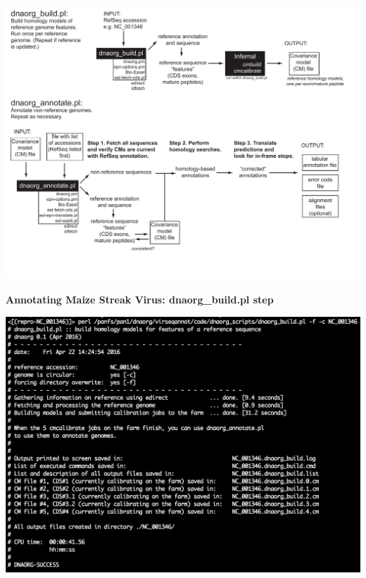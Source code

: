 \documentclass[landscape]{slides}
\begin{document}
\begin{slide}
\includegraphics[width=10in]{figs/dnaorg-scripts-annotate4}
\vfill
\end{slide}
\begin{slide}
\begin{center}
\textbf{Annotating Maize Streak Virus: dnaorg\_build.pl step} 

\includegraphics[width=8in]{figs/dnaorg-build-output}

\end{center}
\vfill
\end{slide}
\end{document}
